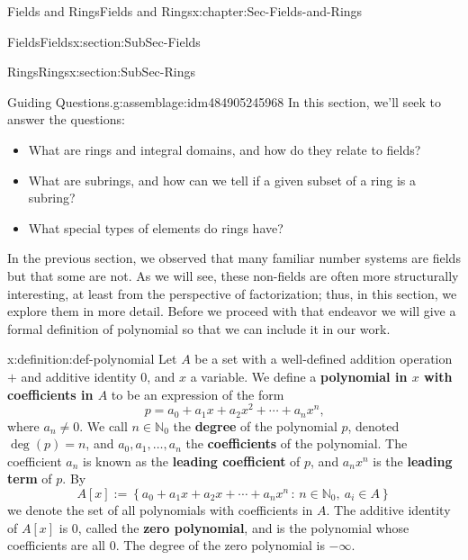 \documentclass[oneside,10pt,]{book}
\newcommand{\terminology}[1]{\textbf{#1}}
\numberwithin{equation}{section}
\newcommand{\setof}[2]{{\left\{#1\,\colon\,#2\right\}}}
\def\N{{\mathbb N}}
\begin{document}
\begin{chapterptx}{Fields and Rings}{}{Fields and Rings}{}{}{x:chapter:Sec-Fields-and-Rings}
\begin{sectionptx}{Fields}{}{Fields}{}{}{x:section:SubSec-Fields}
\end{sectionptx}
%
%
\typeout{************************************************}
\typeout{************************************************}
%
\begin{sectionptx}{Rings}{}{Rings}{}{}{x:section:SubSec-Rings}
\begin{assemblage}{Guiding Questions.}{g:assemblage:idm484905245968}%
In this section, we'll seek to answer the questions: %
\begin{itemize}[label=\textbullet]
\item{}What are rings and integral domains, and how do they relate to fields?%
\item{}What are subrings, and how can we tell if a given subset of a ring is a subring?%
\item{}What special types of elements do rings have?%
\end{itemize}
%
\end{assemblage}
In the previous section, we observed that many familiar number systems are fields but that some are not. As we will see, these non-fields are often more structurally interesting, at least from the perspective of factorization; thus, in this section, we explore them in more detail. Before we proceed with that endeavor we will give a formal definition of polynomial so that we can include it in our work.%
\begin{definition}{}{x:definition:def-polynomial}%
Let \(A\) be a set with a well-defined addition operation \(+\) and additive identity \(0\), and \(x\) a variable. We define a \terminology{polynomial in \(x\) with coefficients in \(A\)} to be an expression of the form%
\begin{equation*}
p = a_0 + a_1 x + a_2 x^2 + \cdots + a_n x^n\text{,}
\end{equation*}
where \(a_n\ne 0\). We call \(n\in \N_0\) the \terminology{degree} of the polynomial \(p\), denoted \(\deg(p) = n\), and \(a_0,a_1,\ldots,
a_n\) the \terminology{coefficients} of the polynomial. The coefficient \(a_n\) is known as the \terminology{leading coefficient} of \(p\), and \(a_n x^n\) is the \terminology{leading term} of \(p\). By%
\begin{equation*}
A[x] := \setof{a_0 + a_1 x + a_2 x + \cdots + a_n x^n}{n\in \N_0, \ a_i\in A}
\end{equation*}
we denote the set of all polynomials with coefficients in \(A\). The additive identity of \(A[x]\) is \(0\), called the \terminology{zero polynomial}, and is the polynomial whose coefficients are all \(0\). The degree of the zero polynomial is \(-\infty\).%

\end{definition}
\end{sectionptx}
\end{chapterptx}
\end{document}

